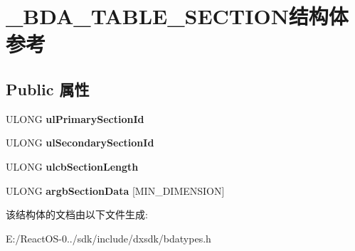 \hypertarget{struct___b_d_a___t_a_b_l_e___s_e_c_t_i_o_n}{}\section{\+\_\+\+B\+D\+A\+\_\+\+T\+A\+B\+L\+E\+\_\+\+S\+E\+C\+T\+I\+O\+N结构体 参考}
\label{struct___b_d_a___t_a_b_l_e___s_e_c_t_i_o_n}
\subsection*{Public 属性}
\begin{DoxyCompactItemize}
\item 
\mbox{\label{struct___b_d_a___t_a_b_l_e___s_e_c_t_i_o_n_aad6abab7080144fb0f8c265a7508a436}} 
U\+L\+O\+NG {\bfseries ul\+Primary\+Section\+Id}
\item 
\mbox{\label{struct___b_d_a___t_a_b_l_e___s_e_c_t_i_o_n_a18e6f9a67fbc654c03c0830e722e719c}} 
U\+L\+O\+NG {\bfseries ul\+Secondary\+Section\+Id}
\item 
\mbox{\label{struct___b_d_a___t_a_b_l_e___s_e_c_t_i_o_n_ae370a4938d93b8abfd9313913f7f11ee}} 
U\+L\+O\+NG {\bfseries ulcb\+Section\+Length}
\item 
\mbox{\label{struct___b_d_a___t_a_b_l_e___s_e_c_t_i_o_n_ada9864085a98bbc5093cd823dc1ec969}} 
U\+L\+O\+NG {\bfseries argb\+Section\+Data} \mbox{[}M\+I\+N\+\_\+\+D\+I\+M\+E\+N\+S\+I\+ON\mbox{]}
\end{DoxyCompactItemize}


该结构体的文档由以下文件生成\+:\begin{DoxyCompactItemize}
\item 
E\+:/\+React\+O\+S-\/0../sdk/include/dxsdk/bdatypes.\+h\end{DoxyCompactItemize}
